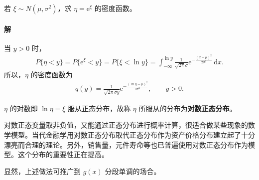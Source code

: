 \documentclass[../../main.tex]{subfiles}
\begin{document}
\begin{example}[对数正态分布]\label{example:ch03-对数正态}
若 $\xi\sim N(\mu,\sigma^{2})$，求 $\eta=\mathrm{e}^{\xi}$ 的密度函数。

\paragraph*{解}当 $y>0$ 时，
\begin{align*}
P\{\eta<y\}=P\{\mathrm{e}^{\xi}<y\}=P\{\xi<\ln y\}=\int_{-\infty}^{\ln y}\frac{1}{\sqrt{2\pi}\sigma}\mathrm{e}^{-\frac{(x-\mu)^{2}}{2\sigma^{2}}}\,\mathrm{d}x.
\end{align*}
所以，$\eta$ 的密度函数为
\begin{align}
q(y)=\frac{1}{\sqrt{2\pi}\sigma y}\mathrm{e}^{-\frac{(\ln y-\mu)^{2}}{2\sigma^{2}}},\qquad y>0.\label{align:ch03-对数正态密度}
\end{align}

$\eta$ 的对数即 $\ln\eta=\xi$ 服从正态分布，故称 $\eta$ 所服从的分布为\textbf{对数正态分布}。

对数正态变量取非负值，又能通过正态分布进行概率计算，很适合做某些现象的数学模型。当代金融学用对数正态分布取代正态分布作为资产价格分布建立起了十分漂亮而合理的理论。另外，销售量，元件寿命等也已普遍使用对数正态分布作为模型。这个分布的重要性正在提高。

显然，上述做法可推广到 $g(x)$ 分段单调的场合。
\end{example}
\end{document}
